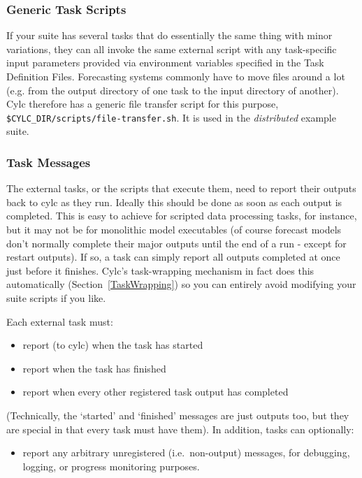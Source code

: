 \documentclass[11pt,a4paper]{article}
\begin{document}
\subsubsection{Generic Task Scripts}

If your suite has several tasks that do essentially the same thing with
minor variations, they can all invoke the same external script with 
any task-specific input parameters provided via environment variables
specified in the Task Definition Files. Forecasting systems commonly
have to move files around a lot (e.g. from the output directory of one
task to the input directory of another). Cylc therefore has a generic
file transfer script for this purpose,
\lstinline=$CYLC_DIR/scripts/file-transfer.sh=. It is used in the
{\em distributed} example suite. 

\subsubsection{Task Messages}

The external tasks, or the scripts that execute them, need to report
their outputs back to cylc as they run. Ideally this should be done as
soon as each output is completed. This is easy to achieve for scripted
data processing tasks, for instance, but it may not be for monolithic
model executables (of course forecast models don't normally complete
their major outputs until the end of a run - except for restart
outputs). If so, a task can simply report all outputs completed at once
just before it finishes.  Cylc's task-wrapping mechanism in fact does
this automatically (Section~\ref{TaskWrapping}) so you can entirely
avoid modifying your suite scripts if you like.

Each external task must:

\begin{itemize}
\item report (to cylc) when the task has started
\item report when the task has finished
\item report when every other registered task output has
completed
\end{itemize}

(Technically, the `started' and `finished' messages are just
outputs too, but they are special in that every task
must have them). In addition, tasks can optionally:

\begin{itemize}
\item report any arbitrary unregistered (i.e.\ non-output)
messages, for debugging, logging, or progress monitoring purposes.
\end{itemize}
\end{document}
